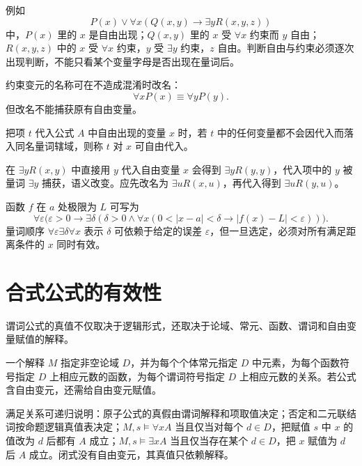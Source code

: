 例如
\[
P(x)\lor\forall x(Q(x,y)\to\exists yR(x,y,z))
\]
中，$P(x)$ 里的 $x$ 是自由出现；$Q(x,y)$ 里的 $x$ 受 $\forall x$ 约束而 $y$ 自由；$R(x,y,z)$ 中的 $x$ 受 $\forall x$ 约束，$y$ 受 $\exists y$ 约束，$z$ 自由。判断自由与约束必须逐次出现判断，不能只看某个变量字母是否出现在量词后。

约束变元的名称可在不造成混淆时改名：
\[
\forall xP(x)\equiv\forall yP(y).
\]
但改名不能捕获原有自由变量。

\begin{definition}[自由代入]\label{ch2-free-substitution}
把项 $t$ 代入公式 $A$ 中自由出现的变量 $x$ 时，若 $t$ 中的任何变量都不会因代入而落入同名量词辖域，则称 $t$ 对 $x$ 可自由代入。
\end{definition}

\begin{pitfall}[变量捕获]\label{ch2-capture}
在 $\exists yR(x,y)$ 中直接用 $y$ 代入自由变量 $x$ 会得到 $\exists yR(y,y)$，代入项中的 $y$ 被量词 $\exists y$ 捕获，语义改变。应先改名为 $\exists uR(x,u)$，再代入得到 $\exists uR(y,u)$。
\end{pitfall}

\begin{example}[title={数学定义的符号化}]\label{ch2-limit}
函数 $f$ 在 $a$ 处极限为 $L$ 可写为
\[
\forall\varepsilon\bigl(\varepsilon>0\to
\exists\delta(\delta>0\land
\forall x(0<|x-a|<\delta\to |f(x)-L|<\varepsilon))\bigr).
\]
量词顺序 $\forall\varepsilon\exists\delta\forall x$ 表示 $\delta$ 可依赖于给定的误差 $\varepsilon$，但一旦选定，必须对所有满足距离条件的 $x$ 同时有效。
\end{example}

\section{合式公式的有效性}

谓词公式的真值不仅取决于逻辑形式，还取决于论域、常元、函数、谓词和自由变量赋值的解释。

\begin{definition}[解释]\label{ch2-interpretation}
一个解释 $M$ 指定非空论域 $D$，并为每个个体常元指定 $D$ 中元素，为每个函数符号指定 $D$ 上相应元数的函数，为每个谓词符号指定 $D$ 上相应元数的关系。若公式含自由变元，还需给自由变元赋值。
\end{definition}

满足关系可递归说明：原子公式的真假由谓词解释和项取值决定；否定和二元联结词按命题逻辑真值表决定；$M,s\models\forall xA$ 当且仅当对每个 $d\in D$，把赋值 $s$ 中 $x$ 的值改为 $d$ 后都有 $A$ 成立；$M,s\models\exists xA$ 当且仅当存在某个 $d\in D$，把 $x$ 赋值为 $d$ 后 $A$ 成立。闭式没有自由变元，其真值只依赖解释。


